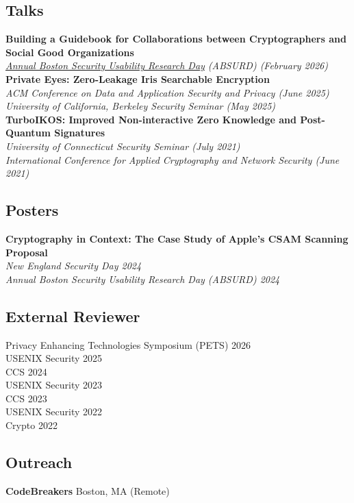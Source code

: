 \documentclass[letterpaper,11pt]{article}
\begin{document}
\subsection*{Talks}
\textbf{Building a Guidebook for Collaborations between Cryptographers and Social Good Organizations}\\
\textit{\href{https://absurd.cs.tufts.edu/index.html}{Annual Boston Security Usability Research Day} (ABSURD) (February 2026)}\\
\textbf{Private Eyes: Zero-Leakage Iris Searchable Encryption} \\
\textit{ACM Conference on Data and Application Security and Privacy (June 2025)} \\
\textit{University of California, Berkeley Security Seminar (May 2025)} \\
\textbf{TurboIKOS: Improved Non-interactive Zero Knowledge and Post-Quantum Signatures}\\
\textit{University of Connecticut Security Seminar (July 2021)} \\ 
\textit{International Conference for Applied Cryptography and Network Security (June 2021) }

\subsection*{Posters}
\textbf{Cryptography in Context: The Case Study of Apple's CSAM Scanning Proposal}\\
\textit{New England Security Day 2024} \\
\textit{Annual Boston Security Usability Research Day (ABSURD) 2024} 

\subsection*{External Reviewer}
Privacy Enhancing Technologies Symposium (PETS) 2026 \\
USENIX Security 2025 \\
CCS 2024 \\
USENIX Security 2023 \\
CCS 2023 \\
USENIX Security 2022 \\ 
Crypto 2022 

\subsection*{Outreach}
\textbf{CodeBreakers} Boston, MA (Remote)	
\end{document}
